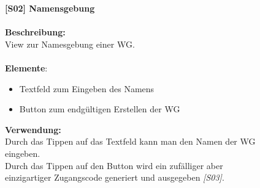 \documentclass[a4paper]{scrreprt}
\begin{document}
\begin{figure}[h!]
    		\begin{minipage}[t]{0.55\linewidth}
    			\flushleft
    			\vspace{9mm}
    			\textbf{{[}S02{]} Namensgebung}\\
    			\hfill
    			\\\textbf{Beschreibung:} \\
    			View zur Namesgebung einer WG.\\
    			\hfill
    			\\\textbf{Elemente}:
    			\begin{itemize}
    				\renewcommand\labelitemi{--}
    				\item Textfeld zum Eingeben des Namens
    				\item Button zum endgültigen Erstellen der WG
    				
    			\end{itemize}
    		
    			\hfill
    			
    			\textbf{Verwendung:}\\
    			Durch das Tippen auf das Textfeld kann man
    			den Namen der WG eingeben. \\
    			Durch das Tippen auf den Button wird ein 
    			zufälliger aber einzigartiger Zugangscode 
    			generiert und ausgegeben \textit{{[}S03{]}}.
    			
    			
    			
    		\end{minipage}
    	\end{figure}
    
    	\clearpage
    	
\end{document}
